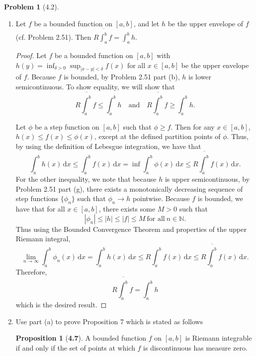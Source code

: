 \documentclass[12pt]{article}
\newcommand{\N}{\mathbb{N}}
\newcommand{\upint}[2]{
  \overline{\int_{#1}^{#2}}
}
\newcommand{\dif}{\, \mathrm{d}}
\theoremstyle{definition}
\newtheorem{problem}{Problem}
\newtheorem*{prop}{Proposition}
\begin{document}
\begin{problem}[4.2] 



    \begin{enumerate}[label = (\alph{*})]
    
        \item Let \( f \) be a bounded function on \( [a,b] \), and let \( h \) be the upper envelope of \( f \) (cf. Problem 2.51). Then \( \displaystyle R \upint{a}{b} f = \int_{a}^{b} h \).
        
            \begin{proof}
                Let \( f \) be a bounded function on \( [a,b] \) with \( \displaystyle h(y) = \inf_{\delta > 0} \sup_{|x-y| < \delta} f(x) \) for all \( x \in [a,b] \) be the upper envelope of \( f \). 
                Because \( f \) is bounded, by Problem 2.51 part (b), \( h \) is lower semicontinuous. 
                To show equality, we will show that 
                    \[
                        R \upint{a}{b} f \leq \int_{a}^{b} h \quad \text{and} \quad R \upint{a}{b} f \geq \int_{a}^{b} h.
                    \]
                
                Let \( \phi \) be a step function on \( [a,b] \) such that \( \phi \geq f \).
                Then for any \( x \in [a,b] \), \( h(x) \leq f(x) \leq \phi(x) \), except at the defined partition points of \( \phi \). 
                Thus, by using the definition of Lebesgue integration, we have that 
                    \[
                        \int_{a}^{b} h(x) \dif x \leq \int_{a}^{b} f(x) \dif x = \inf \int_{a}^{b} \phi(x) \dif x \leq R \upint{a}{b} f(x) \dif x.
                    \]
                For the other inequality, we note that because \( h \) is upper semicontinuous, by Problem 2.51 part (g), there exists a monotonically decreasing sequence of step functions \( \{\phi_n \} \) such that \( \phi_n \to h \) pointwise. 
                Because \( f \) is bounded, we have that for all \( x \in [a,b] \), there exists some \( M > 0 \) such that 
                    \[
                        |\phi_n| \leq |h| \leq |f| \leq M \ \text{for all} \ n \in \N.   
                    \]
                Thus using the Bounded Convergence Theorem and properties of the upper Riemann integral, 
                    \[
                          \lim_{n \to \infty} \int_{a}^{b} \phi_n(x) \dif x = \int_{a}^{b} h(x) \dif x \leq R \int_{a}^{b} f(x) \dif x \leq R \upint{a}{b} f(x) \dif x.
                    \]
                Therefore, 
                    \[
                        R \upint{a}{b} f = \int_{a}^{b} h
                    \]
                which is the desired result.
            \end{proof}
        \item Use part (a) to prove Proposition 7 which is stated as follows
            \begin{prop}[\textbf{4.7}]
                A bounded function \( f \) on \( [a,b] \) is Riemann integrable if and only if the set of points at which \( f \) is discontinuous has measure zero. 


\end{prop}
\end{enumerate}
\end{problem}
\end{document}
